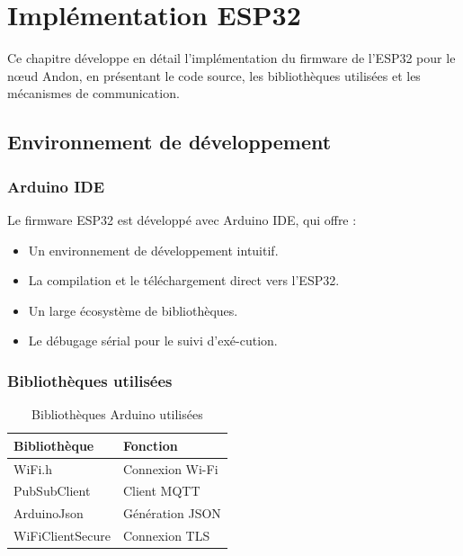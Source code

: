 \chapter{Impl\'ementation ESP32}

Ce chapitre d\'eveloppe en d\'etail l'impl\'ementation du firmware de l'ESP32 pour le n\oe{}ud Andon, en pr\'esentant le code source, les biblioth\`eques utilis\'ees et les m\'ecanismes de communication.

\section{Environnement de d\'eveloppement}

\subsection{Arduino IDE}

Le firmware ESP32 est d\'evelopp\'e avec Arduino IDE, qui offre :

\begin{itemize}
    \item Un environnement de d\'eveloppement intuitif.
    \item La compilation et le t\'el\'echargement direct vers l'ESP32.
    \item Un large \'ecosyst\`eme de biblioth\`eques.
    \item Le d\'ebugage s\'erial pour le suivi d'ex\'e-cution.
\end{itemize}

\subsection{Biblioth\`eques utilis\'ees}

\begin{table}[htbp]
\centering
\renewcommand{\arraystretch}{1.3}
\begin{tabular}{l l}
\toprule
\textbf{Biblioth\`eque} & \textbf{Fonction} \\
\midrule
WiFi.h & Connexion Wi-Fi \\
PubSubClient & Client MQTT \\
ArduinoJson & G\'en\'eration JSON \\
WiFiClientSecure & Connexion TLS \\
\bottomrule
\end{tabular}
\caption{Biblioth\`eques Arduino utilis\'ees}
\label{tab:bibliotheques_arduino}
\end{table}

